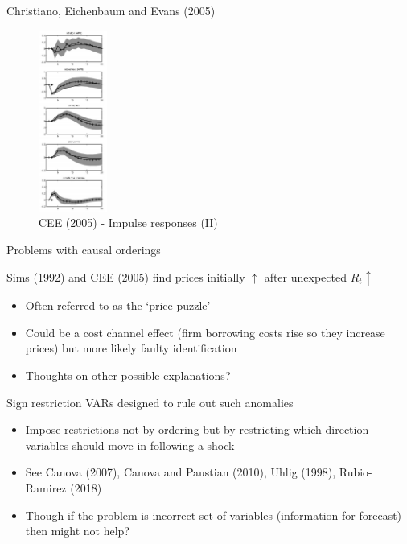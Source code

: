 
\begin{frame}{Christiano, Eichenbaum and Evans (2005)}

\begin{figure}
\caption[CEE - Subset 1]{CEE (2005) - Impulse responses (II)}
\centering
\label{fig:more_cee_responses}
\includegraphics[width=0.20\textwidth]{Figures/more_cee_responses.JPG}
\end{figure}

\end{frame}


\begin{frame}{Problems with causal orderings}

Sims (1992) and CEE (2005) find prices initially $\uparrow $ after unexpected $R_{t} \uparrow$
	\begin{itemize}
	\item	Often referred to as the `price puzzle'
	\item 	Could be a cost channel effect (firm borrowing costs rise so they increase prices) but more likely faulty identification	
	\item	Thoughts on other possible explanations?
	\end{itemize}
\vspace{2mm}
Sign restriction VARs designed to rule out such anomalies
	\begin{itemize}
	\item	Impose restrictions not by ordering but by restricting which direction variables should move in following a shock
	\item	See Canova (2007), Canova and Paustian (2010), Uhlig (1998), Rubio-Ramirez (2018)
	\item	Though if the problem is incorrect set of variables (information for forecast) then might not help?
	\end{itemize}

\end{frame}

